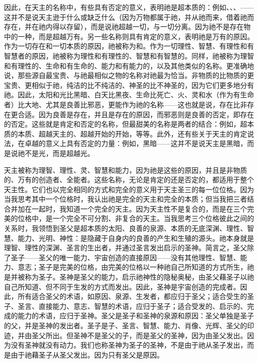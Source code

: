 因此，在天主的名称中，有些具有否定的意义，表明祂是超本质的：例如、、、——这并不是说天主逊于什么或缺乏什么（因为万物都属于祂，并从祂而来，借着祂而存在，并在祂内得以存留），而是说祂超越一切，与一切分离。因为祂不是存在物中的一种，而是超越万有。另一些名称则具有肯定的意义，表明祂是万有的原因。作为一切存在和一切本质的原因，祂被称为和。作为一切理性、智慧、有理性和有智慧者的原因，祂被称为理性和有理性的、智慧和有智慧的。同样，祂被称为理智和有理性的、生命和有生命的、能力和有能力的，以及其他类似的名称。更准确地说，那些源自最宝贵、与祂最相似之物的名称对祂最为恰当。非物质的比物质的更宝贵、更相似于祂，纯洁的比不纯洁的、神圣的比不神圣的，因为它们更多地分有祂。因此，太阳和光比黑暗、白天比黑夜、生命比死亡、火、灵和水（作为有生命者）比大地、尤其是良善比邪恶，更能作为祂的名称——这也就是说，存在比非存在更合适。因为良善是存在，并且是存在的原因，而邪恶则是良善的否定，即存在的否定。这些就是肯定和否定的名称，但最甜美的名称是两者的结合：例如，超本质的本质、超越天主的、超越开始的开始，等等。此外，还有些关于天主的肯定说法，在卓越的意义上具有否定的力量：例如，黑暗——这并不是说天主是黑暗，而是说祂不是光，而是超越光。\par

天主被称为理智、理性、灵、智慧和能力，因为祂是这些的原因，并且是非物质的、万有的创造者、全能者。这些名称，无论是肯定的还是否定的，都适用于整个天主性。它们也以完全相同的方式和完全的意义用于天主圣三的每一位位格。因为当我思考其中一个位格时，我认出祂是完全的天主和完全的本质；但当我把三者结合并加在一起时，我知道一个完全的天主。因为天主性不是复合的，而是在三个完美的位格中，是一个完全不可分割、非复合的天主。当我思考三个位格彼此之间的关系时，我领悟到圣父是超本质的太阳、良善的泉源、本质的无底深渊、理性、智慧、能力、光明、神性：是隐藏于自身内的良善的产生和生殖的源头。祂本身就是理智、理性的深渊、圣言的生出者，并通过圣言发出启示的圣神。简言之，圣父除了圣子——圣父的唯一能力、宇宙创造的直接原因——没有其他理性、智慧、能力、意志；圣子是完美的位格，由完美的位格以一种祂自己所知道的方式所生，祂是并被称为圣子。圣神是圣父的能力，启示祂神性的隐秘奥秘，由圣父藉圣子以祂自己所知道、但不同于生发的方式而发出。因此，圣神是宇宙创造的完成者。因此，所有适合圣父的术语，如原因、泉源、生发者，都应归于圣父；适合受生的圣子、圣言、直接能力、意志、智慧的术语，应归于圣子；适合受发的、启示的、完成的能力的术语，应归于圣神。圣父是圣子和圣神的泉源和原因：圣父单独是圣子的父，并是圣神的发出者。圣子是子、圣言、智慧、能力、肖像、光辉、圣父的印迹，并由圣父所出。但圣神不是圣父的子，而是圣父的圣神，因为由圣父发出。因为没有圣神就没有动力。我们也称圣神为圣子的圣神，不是由于祂从圣子发出，而是由于祂藉圣子从圣父发出。因为只有圣父是原因。\par

